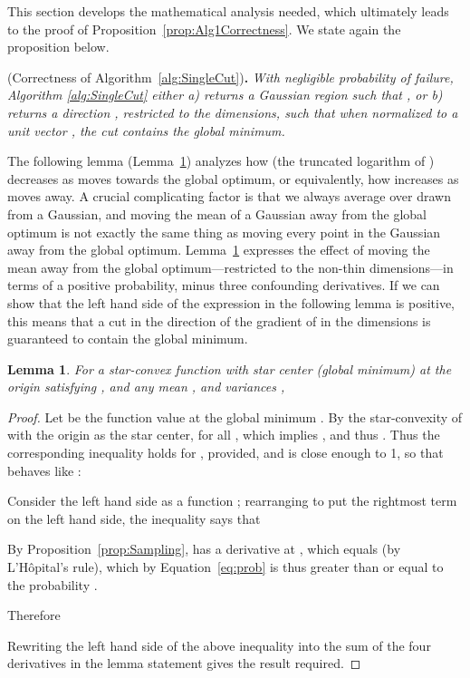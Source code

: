 \documentclass[11pt,letter]{article}
\newcounter{nTheorems}
\numberwithin{nTheorems}{section}
\newtheorem{lemma}[nTheorems]{Lemma}
\begin{document}
This section develops the mathematical analysis needed, which ultimately leads to the proof of Proposition~\ref{prop:Alg1Correctness}.
We state again the proposition below.

\medskip{} (Correctness of Algorithm~\ref{alg:SingleCut}){\bf .} \emph{With negligible probability of failure, Algorithm \ref{alg:SingleCut} either a) returns a Gaussian region  such that , or b) returns a direction , restricted to the  dimensions, such that when normalized to a unit vector , the cut  contains the global minimum.
}

The following lemma (Lemma~\ref{lem:CutLB}) analyzes how  (the truncated logarithm of ) decreases as  moves towards the global optimum, or equivalently, how  increases as  moves away.
A crucial complicating factor is that we always average  over  drawn from a Gaussian, and moving the mean of a Gaussian away from the global optimum is not exactly the same thing as moving every point in the Gaussian away from the global optimum.
Lemma~\ref{lem:CutLB} expresses the effect of moving the mean away from the global optimum---restricted to the non-thin  dimensions---in terms of a positive probability, minus three confounding derivatives.
If we can show that the left hand side of the expression in the following lemma is positive, this means that a cut in the direction of the gradient of  in the  dimensions is guaranteed to contain the global minimum.
\begin{lemma}
\label{lem:CutLB}
For a star-convex function  with star center (global minimum) at the origin satisfying , and any mean , and variances ,

\end{lemma}

\begin{proof}
Let  be the function value at the global minimum . By the star-convexity of  with the origin as the star center,  for all , which implies , and thus . Thus the corresponding inequality holds for , provided,  and  is close enough to 1, so that  behaves like :


Consider the left hand side as a function ; rearranging to put the rightmost term on the left hand side, the inequality says that 

By Proposition~\ref{prop:Sampling},  has a derivative at , which equals  (by L'H\^{o}pital's rule), which by Equation~\ref{eq:prob} is thus greater than or equal to the probability .



Therefore

Rewriting the left hand side of the above inequality into the sum of the four derivatives in the lemma statement gives the result required.
\end{proof}
\end{document}

